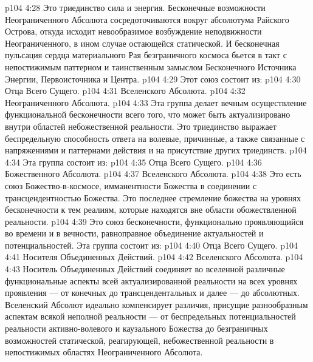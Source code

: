\vs p104 4:28 Это триединство  сила и энергия. Бесконечные возможности Неограниченного Абсолюта сосредоточиваются вокруг абсолютума Райского Острова, откуда исходит невообразимое возбуждение неподвижности Неограниченного, в ином случае остающейся статической. И бесконечная пульсация сердца материального Рая безграничного космоса бьется в такт с непостижимым паттерном и таинственным замыслом Бесконечного Источника Энергии, Первоисточника и Центра.
\vs p104 4:29 \pc {} Этот союз состоит из:
\vs p104 4:30 \bibnobreakspace Отца Всего Сущего.
\vs p104 4:31 \bibnobreakspace Вселенского Абсолюта.
\vs p104 4:32 \bibnobreakspace Неограниченного Абсолюта.
\vs p104 4:33 \pc Эта группа делает вечным осуществление функциональной бесконечности всего того, что может быть актуализировано внутри областей небожественной реальности. Это триединство выражает беспредельную способность ответа на волевые, причинные, а также связанные с напряжениями и паттернами действия и на присутствие других триединств.
\vs p104 4:34 \pc {} Эта группа состоит из:
\vs p104 4:35 \bibnobreakspace Отца Всего Сущего.
\vs p104 4:36 \bibnobreakspace Божественного Абсолюта.
\vs p104 4:37 \bibnobreakspace Вселенского Абсолюта.
\vs p104 4:38 Это есть союз Божество\hyp{}в\hyp{}космосе, имманентности Божества в соединении с трансцендентностью Божества. Это последнее стремление божества на уровнях бесконечности к тем реалиям, которые находятся вне области обожествленной реальности.
\vs p104 4:39 \pc {} Это союз бесконечности, функционально проявляющийся во времени и в вечности, равноправное объединение актуальностей и потенциальностей. Эта группа состоит из:
\vs p104 4:40 \bibnobreakspace Отца Всего Сущего.
\vs p104 4:41 \bibnobreakspace Носителя Объединенных Действий.
\vs p104 4:42 \bibnobreakspace Вселенского Абсолюта.
\vs p104 4:43 \pc Носитель Объединенных Действий соединяет во вселенной различные функциональные аспекты всей актуализированной реальности на всех уровнях проявления --- от конечных до трансцендентальных и далее --- до абсолютных. Вселенский Абсолют идеально компенсирует различия, присущие разнообразным аспектам всякой неполной реальности --- от беспредельных потенциальностей реальности активно\hyp{}волевого и каузального Божества до безграничных возможностей статической, реагирующей, небожественной реальности в непостижимых областях Неограниченного Абсолюта.
